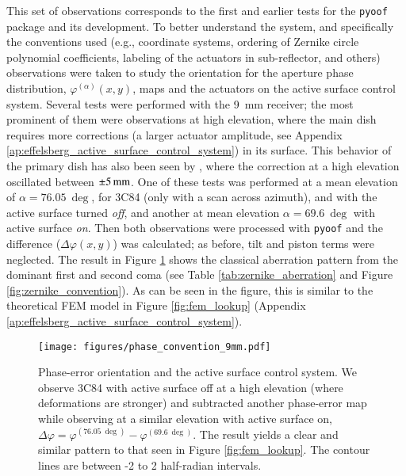\documentclass[
    ]
    {aa}
\begin{document}
    This set of observations corresponds to the first and earlier tests for the \texttt{pyoof} package and its development. To better understand the system, and specifically the conventions used (e.g., coordinate systems, ordering of Zernike circle polynomial coefficients, labeling of the actuators in sub-reflector, and others) observations were taken to study the orientation for the aperture phase distribution, $\varphi^{(\alpha)}(x, y)$, maps and the actuators on the active surface control system. Several tests were performed with the \SI{9}{\milli\meter} receiver; the most prominent of them were observations at high elevation, where the main dish requires more corrections (a larger actuator amplitude, see Appendix \ref{ap:effelsberg_active_surface_control_system}) in its surface. This behavior of the primary dish has also been seen by \cite{2015JAGeo...9....1H}, where the correction at a high elevation oscillated between $\SI{\pm5}{\milli\meter}$.
    One of these tests was performed at a mean elevation of $\alpha=\SI{76.05}{\deg}$, for 3C84 (only with a scan across azimuth), and with the active surface turned \textit{off}, and another at mean elevation $\alpha=\SI{69.6}{\deg}$ with active surface \textit{on}. Then both observations were processed with \texttt{pyoof} and the difference ($\Delta\varphi(x, y)$) was calculated; as before, tilt and piston terms were neglected. The result in Figure \ref{fig:phase_convention_9mm} shows the classical aberration pattern from the dominant first and second coma (see Table \ref{tab:zernike_aberration} and Figure \ref{fig:zernike_convention}). As can be seen in the figure, this is similar to the theoretical FEM model in Figure \ref{fig:fem_lookup} (Appendix \ref{ap:effelsberg_active_surface_control_system}).

    \begin{figure}[t]
        \centering
        \texttt{[image: figures/phase\_convention\_9mm.pdf]}
        \caption{Phase-error orientation and the active surface control system. We observe 3C84 with active surface off at a high elevation (where deformations are stronger) and subtracted another phase-error map while observing at a similar elevation with active surface on, $\Delta\varphi = \varphi^{(\SI{76.05}{\deg})} - \varphi^{(\SI{69.6}{\deg})}$. The result yields a clear and similar pattern to that seen in Figure \ref{fig:fem_lookup}. The contour lines are between -2 to 2 half-radian intervals.}
        \label{fig:phase_convention_9mm}
    \end{figure}
\end{document}
